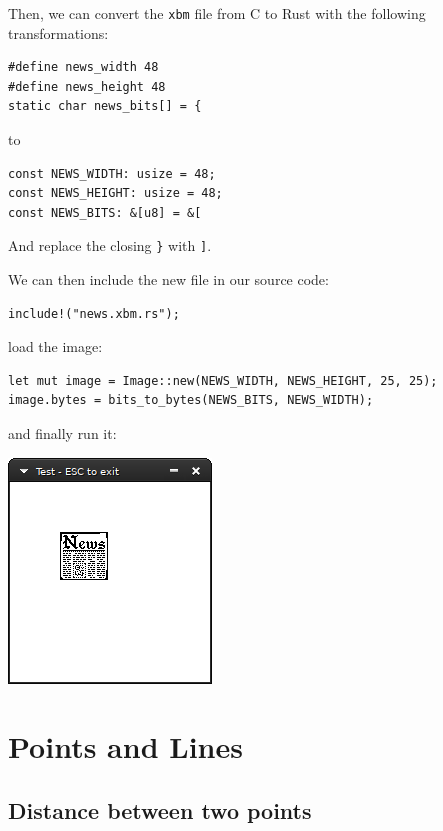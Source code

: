 \documentclass[12pt,a4,oneside,usenames,dvipsnames]{book}
\begin{document}
Then, we can convert the \texttt{xbm} file from C to Rust with the following transformations:

\begin{verbatim}
#define news_width 48
#define news_height 48
static char news_bits[] = {
\end{verbatim}

to


\begin{verbatim}
const NEWS_WIDTH: usize = 48;
const NEWS_HEIGHT: usize = 48;
const NEWS_BITS: &[u8] = &[
\end{verbatim}

And replace the closing \texttt{\}} with \texttt{]}.

We can then include the new file in our source code:


\begin{verbatim}
include!("news.xbm.rs");
\end{verbatim}

load the image:

\begin{verbatim}
let mut image = Image::new(NEWS_WIDTH, NEWS_HEIGHT, 25, 25);
image.bytes = bits_to_bytes(NEWS_BITS, NEWS_WIDTH);
\end{verbatim}

and finally run it:

\includegraphics{figures/intro-2.png}

\part{Points and Lines}
\chapter{Distance between two points}

\begin{center}

\end{center}
\end{document}
